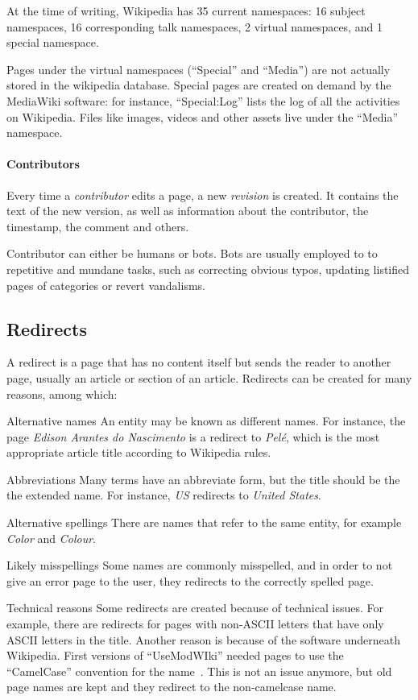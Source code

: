 At the time of writing, Wikipedia has 35 current namespaces: 16 subject namespaces, 16 corresponding talk namespaces, 2 virtual namespaces, and 1 special namespace.

Pages under the virtual namespaces (``Special'' and ``Media'') are not actually stored in the wikipedia database.
Special pages are created on demand by the MediaWiki software: for instance, ``Special:Log'' lists the log of all the activities on Wikipedia.
Files like images, videos and other assets live under the ``Media'' namespace.

\paragraph{Contributors}
Every time a \emph{contributor} edits a page, a new \emph{revision} is created.
It contains the text of the new version, as well as information about the contributor, the timestamp, the comment and others.

Contributor can either be humans or bots.
Bots are usually employed to to repetitive and mundane tasks, such as correcting obvious typos, updating listified pages of categories or revert vandalisms.

\subsection{Redirects}
A redirect is a page that has no content itself but sends the reader to another page, usually an article or section of an article.
Redirects can be created for many reasons, among which:
\begin{description*}
    \item[Alternative names] An entity may be known as different names.
    For instance, the page \emph{Edison Arantes do Nascimento} is a redirect to \emph{Pelé}, which is the most appropriate article title according to Wikipedia rules.
    \item[Abbreviations] Many terms have an abbreviate form, but the title should be the the extended name.
    For instance, \emph{US} redirects to \emph{United States}.
    \item[Alternative spellings] There are names that refer to the same entity, for example \emph{Color} and \emph{Colour}.
    \item[Likely misspellings] Some names are commonly misspelled, and in order to not give an error page to the user, they redirects to the correctly spelled page.
    \item[Technical reasons] Some redirects are created because of technical issues.
    For example, there are redirects for pages with non-ASCII letters that have only ASCII letters in the title.
    Another reason is because of the software underneath Wikipedia.
    First versions of ``UseModWIki'' needed pages to use the ``CamelCase'' convention for the name~\cite{wiki:camelcase}.
    This is not an issue anymore, but old page names are kept and they redirect to the non-camelcase name.
\end{description*}


